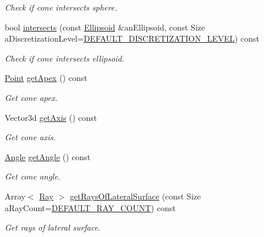 \begin{DoxyCompactItemize}
\begin{DoxyCompactList}\small\item\em Check if cone intersects sphere. \end{DoxyCompactList}\item 
bool \hyperlink{classostk_1_1math_1_1geom_1_1d3_1_1objects_1_1_cone_a18180f9cf2ee2ec6ef37b478c16a55b4}{intersects} (const \hyperlink{classostk_1_1math_1_1geom_1_1d3_1_1objects_1_1_ellipsoid}{Ellipsoid} \&an\+Ellipsoid, const Size a\+Discretization\+Level=\hyperlink{_pyramid_8hpp_a3eb9931e85ba4c9718113211e549e91d}{D\+E\+F\+A\+U\+L\+T\+\_\+\+D\+I\+S\+C\+R\+E\+T\+I\+Z\+A\+T\+I\+O\+N\+\_\+\+L\+E\+V\+EL}) const
\begin{DoxyCompactList}\small\item\em Check if cone intersects ellipsoid. \end{DoxyCompactList}\item 
\hyperlink{classostk_1_1math_1_1geom_1_1d3_1_1objects_1_1_point}{Point} \hyperlink{classostk_1_1math_1_1geom_1_1d3_1_1objects_1_1_cone_acc452d4c78df49bf3f15c840d6e15c1f}{get\+Apex} () const
\begin{DoxyCompactList}\small\item\em Get cone apex. \end{DoxyCompactList}\item 
Vector3d \hyperlink{classostk_1_1math_1_1geom_1_1d3_1_1objects_1_1_cone_a061a6572fea78dcd22b4466a57bd1b6b}{get\+Axis} () const
\begin{DoxyCompactList}\small\item\em Get cone axis. \end{DoxyCompactList}\item 
\hyperlink{classostk_1_1math_1_1geom_1_1_angle}{Angle} \hyperlink{classostk_1_1math_1_1geom_1_1d3_1_1objects_1_1_cone_ac288545383fe1514951ce13f1e7611f3}{get\+Angle} () const
\begin{DoxyCompactList}\small\item\em Get cone angle. \end{DoxyCompactList}\item 
Array$<$ \hyperlink{classostk_1_1math_1_1geom_1_1d3_1_1objects_1_1_ray}{Ray} $>$ \hyperlink{classostk_1_1math_1_1geom_1_1d3_1_1objects_1_1_cone_a8dc14bb0164c5bf0b2525aaa4c52ea5a}{get\+Rays\+Of\+Lateral\+Surface} (const Size a\+Ray\+Count=\hyperlink{_cone_8hpp_a95759f940e1d5e70e977d66fa8fcb5ec}{D\+E\+F\+A\+U\+L\+T\+\_\+\+R\+A\+Y\+\_\+\+C\+O\+U\+NT}) const
\begin{DoxyCompactList}\small\item\em Get rays of lateral surface. \end{DoxyCompactList}\item 

\end{DoxyCompactItemize}

